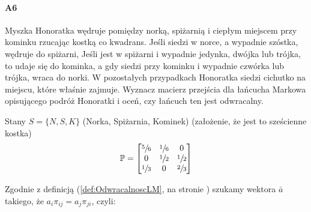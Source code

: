 \paragraph{A6} Myszka Honoratka wędruje pomiędzy norką, spiżarnią i ciepłym miejscem przy kominku rzucając kostką co kwadrans. Jeśli siedzi w norce, a wypadnie szóstka, wędruje do spiżarni, Jeśli jest w spiżarni i wypadnie jedynka, dwójka lub trójka, to udaje się do kominka, a gdy siedzi przy kominku i wypadnie czwórka lub trójka, wraca do norki. W pozostałych przypadkach Honoratka siedzi cichutko na miejscu, które właśnie zajmuje. Wyznacz macierz przejścia dla łańcucha Markowa opisującego podróż Honoratki i oceń, czy łańcuch ten jest odwracalny.

Stany $S=\{N,S,K\}$ (Norka, Spiżarnia, Kominek) (założenie, że jest to sześcienne kostka)
$$\mathbb{P}=\begin{bmatrix}
\sfrac{5}{6}&\sfrac{1}{6}&0\\
0&\sfrac{1}{2}&\sfrac{1}{2}\\
\sfrac{1}{3}&0&\sfrac{2}{3}
\end{bmatrix}$$
\begin{figure}[H]
\centering
{}
\end{figure}
Zgodnie z definicją (\ref{def:OdwracalnoscLM}, na stronie \pageref{def:OdwracalnoscLM}) szukamy wektora $\bar{a}$ takiego, że $a_i\pi_{ij}=a_j\pi_{ji}$, czyli:
